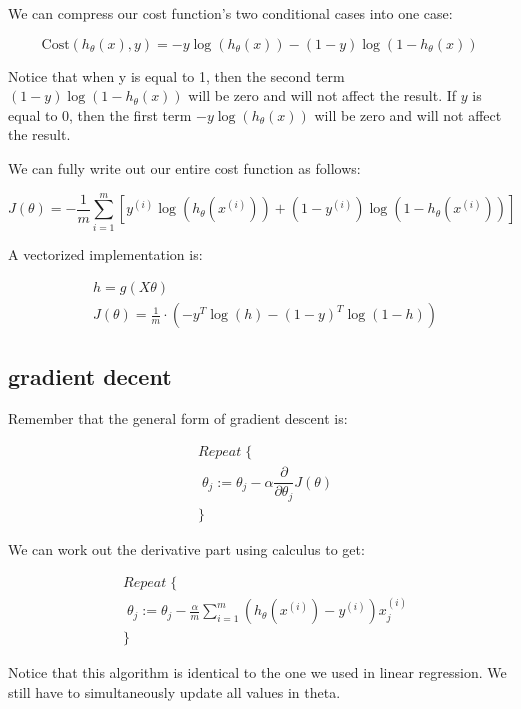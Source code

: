 \documentclass[10pt,a4paper,UTF8]{article}
\begin{document}
We can compress our cost function's two conditional cases into one case:

\begin{equation}
\label{eq:1}
\mathrm{Cost}(h_\theta(x),y) = - y  \log(h_\theta(x)) - (1 - y) \log(1 - h_\theta(x))
\end{equation}

Notice that when y is equal to 1, then the second term \((1-y)\log (1-h_{\theta}(x))\) will be zero and will not affect the result. If \(y\) is equal to 0, then the first term \(-y\log (h_{\theta}(x))\)  will be zero and will not affect the result.

We can fully write out our entire cost function as follows:

\begin{equation}
\label{eq:2}
J(\theta) = - \frac{1}{m} \displaystyle \sum_{i=1}^m [y^{(i)}\log (h_\theta (x^{(i)})) + (1 - y^{(i)})\log (1 - h_\theta(x^{(i)}))]
\end{equation}

A vectorized implementation is:

\begin{align*} & h = g(X\theta)\\ & J(\theta) = \frac{1}{m} \cdot \left(-y^{T}\log(h)-(1-y)^{T}\log(1-h)\right) \end{align*}

\subsection{gradient decent}
\label{sec:org77b8214}

Remember that the general form of gradient descent is:

\begin{align*}& Repeat \; \lbrace \\ & \; \theta_j := \theta_j - \alpha \dfrac{\partial}{\partial \theta_j}J(\theta) \\ & \rbrace\end{align*}

We can work out the derivative part using calculus to get:

\begin{align*} & Repeat \; \lbrace \\ & \; \theta_j := \theta_j - \frac{\alpha}{m} \sum_{i=1}^m (h_\theta(x^{(i)}) - y^{(i)}) x_j^{(i)} \\ & \rbrace \end{align*}

Notice that this algorithm is identical to the one we used in linear regression. We still have to simultaneously update all values in theta.
\end{document}

